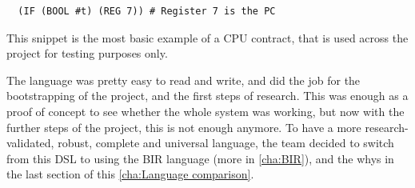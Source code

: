 \begin{verbatim}
  (IF (BOOL #t) (REG 7)) # Register 7 is the PC
\end{verbatim}

This snippet is the most basic example of a CPU contract, that is used across the
project for testing purposes only.

The language was pretty easy to read and write, and did the job for the
bootstrapping of the project, and the first steps of research. This was enough
as a proof of concept to see whether the whole system was working, but now with the
further steps of the project, this is not enough anymore. To have a more research-validated,
robust, complete and universal language, the team decided to switch from this
DSL to using the BIR language (more in \cref{cha:BIR}), and the whys in the last
section of this \cref{cha:Language comparison}.

